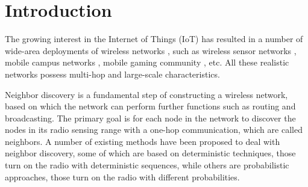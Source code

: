\section{Introduction}






The growing interest in the Internet of Things (IoT) has resulted 
in a number of wide-area deployments of wireless networks \cite{qin2014software},
such as wireless sensor networks \cite{yick2008wireless}, mobile campus networks 
\cite{hernandez2005comparative}, mobile gaming community \cite{cunningham2002optimizing}, etc.
All these realistic networks possess multi-hop and large-scale characteristics.

Neighbor discovery is a fundamental step of constructing a wireless network, based on 
which the network can perform further functions such as routing and broadcasting.
The primary goal is for each node in the network to discover the nodes in its radio sensing range 
with a one-hop communication, which are called neighbors. 
A number of existing methods \cite{dutta2008practical, kandhalu2010u,
bakht2012searchlight, sun2014hello, chen2015heterogeneous,
wang2015blinddate, qiu2016talk, mcglynn2001birthday,
vasudevan2009neighbor, you2011aloha, song2014probabilistic} have been proposed 
to deal with neighbor discovery, some of which are based on deterministic techniques, 
those turn on the radio with deterministic sequences,
while others are probabilistic approaches, those turn on the radio with different probabilities.


